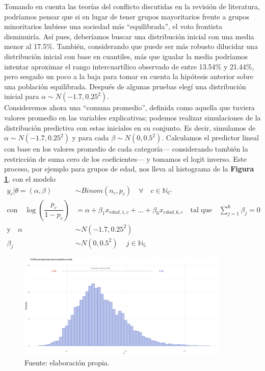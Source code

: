 Tomando en cuenta las teorías del conflicto discutidas en la revisión de literatura, podríamos pensar que si en lugar de tener grupos mayoritarios frente a grupos minoritarios hubiese una sociedad más ``equilibrada'', el voto frontista disminuiría. Así pues, deberíamos buscar una distribución inicial con una media menor al 17.5\%. También, considerando que puede ser más robusto dilucidar una distribución inicial con base en cuantiles, más que igualar la media podríamos intentar aproximar el rango intercuartílico observado de entre 13.54\% y 21.44\%, pero sesgado un poco a la baja para tomar en cuenta la hipótesis anterior sobre una población equilibrada. Después de algunas pruebas elegí una distribución inicial para $\alpha\sim N(-1.7,0.25^2)$.\\

Consideremos ahora una ``comuna promedio'', definida como aquella que tuviera valores promedio en las variables explicativas; podemos realizar simulaciones de la distribución predictiva con estas iniciales en su conjunto. Es decir, simulamos de $\alpha\sim N(-1.7,0.25^2)$ y para cada $\beta\sim N(0,0.5^2)$. Calculamos el predictor lineal con base en los valores promedio de cada categoría--- considerando también la restricción de suma cero de los coeficientes--- y tomamos el logit inverso. Este proceso, por ejemplo para grupos de edad, nos lleva al histograma de la \textbf{Figura \ref{fig:Predictiva_Inicial}}, con el modelo
\begin{align*}
y_c|\theta=(\alpha,\beta) & \sim Binom(n_c,p_c) \quad \forall \quad c \in \mathbb{N}_C \\
\text{con} \quad \log\left(\dfrac{p_c}{1-p_c}\right) &= \alpha + \beta_1 x_{edad,1,c} + \dots + \beta_6 x_{edad,6,c} \quad \text{tal que} \quad \sum\limits_{j = 1}^6 \beta_j = 0 \nonumber \\
\text{y} \quad \alpha & \sim N(-1.7,0.25^2)\\
\beta_j & \sim N(0,0.5^2) \quad \, j \in \mathbb{N}_{5} 
\end{align*}

\begin{figure}[h]
	\centering
	\includegraphics[width = 0.9\textwidth]{Figs/Modelado/Pred_Inicial}
	\caption{Fuente: elaboración propia.}
	\label{fig:Predictiva_Inicial}
\end{figure}

